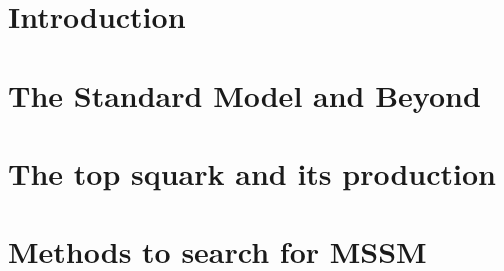 \documentclass[12pt,a4paper]{report}
\begin{document}
\pagestyle{empty}
\tableofcontents
\clearpage

\pagestyle{fancy}
\fancyhead[L]{\empty}
\setlength{\headheight}{27pt} %

\setcounter{page}{1}

\chapter{Introduction}



\chapter{The Standard Model and Beyond}
\label{chap:2}


\chapter{The top squark and its production}
\label{chap:3}


\chapter{Methods to search for MSSM}
\label{chap:4}

\end{document}
